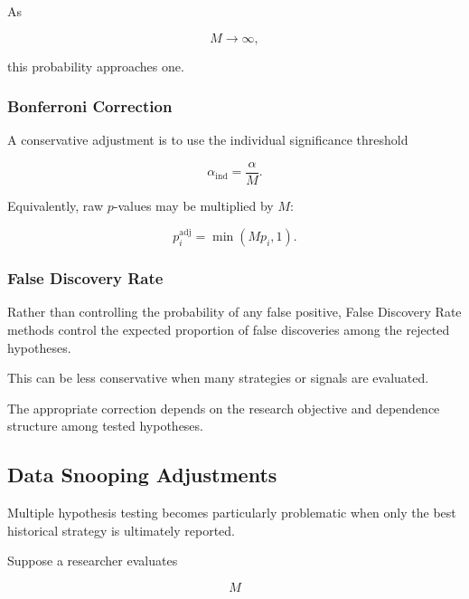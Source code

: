 \documentclass[11pt,a4paper]{article}
\begin{document}
As

\begin{equation}
M\rightarrow\infty,
\end{equation}

this probability approaches one.


\subsubsection{Bonferroni Correction}

A conservative adjustment is to use the individual significance threshold

\begin{equation}
\boxed{
\alpha_{\mathrm{ind}}
=
\frac{
\alpha
}{
M
}.
}
\end{equation}

Equivalently, raw $p$-values may be multiplied by $M$:

\begin{equation}
\boxed{
p_i^{\mathrm{adj}}
=
\min
\left(
Mp_i,
1
\right).
}
\end{equation}


\subsubsection{False Discovery Rate}

Rather than controlling the probability of any false positive, False Discovery
Rate methods control the expected proportion of false discoveries among the
rejected hypotheses.

This can be less conservative when many strategies or signals are evaluated.

The appropriate correction depends on the research objective and dependence
structure among tested hypotheses.


\subsection{Data Snooping Adjustments}
\label{subsec:data_snooping_adjustments}

Multiple hypothesis testing becomes particularly problematic when only the best
historical strategy is ultimately reported.

Suppose a researcher evaluates

\begin{equation}
M
\end{equation}
\end{document}
